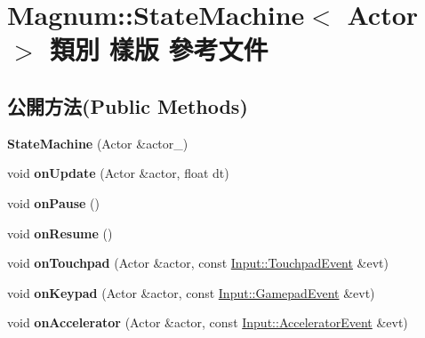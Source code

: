 \hypertarget{class_magnum_1_1_state_machine}{}\section{Magnum\+:\+:State\+Machine$<$ Actor $>$ 類別 樣版 參考文件}
\label{class_magnum_1_1_state_machine}
\subsection*{公開方法(Public Methods)}
\begin{DoxyCompactItemize}
\item 
{\bfseries State\+Machine} (Actor \&actor\+\_\+)\hypertarget{class_magnum_1_1_state_machine_a1f530100fca6bc09bf0b3fb9c5f458fb}{}\label{class_magnum_1_1_state_machine_a1f530100fca6bc09bf0b3fb9c5f458fb}

\item 
void {\bfseries on\+Update} (Actor \&actor, float dt)\hypertarget{class_magnum_1_1_state_machine_a10d52e27c6a2c0315d663aa64a4785dd}{}\label{class_magnum_1_1_state_machine_a10d52e27c6a2c0315d663aa64a4785dd}

\item 
void {\bfseries on\+Pause} ()\hypertarget{class_magnum_1_1_state_machine_a432b7584b2e4870038a9caf0bd861b7e}{}\label{class_magnum_1_1_state_machine_a432b7584b2e4870038a9caf0bd861b7e}

\item 
void {\bfseries on\+Resume} ()\hypertarget{class_magnum_1_1_state_machine_a2867b609c964769e91bde527496d7c54}{}\label{class_magnum_1_1_state_machine_a2867b609c964769e91bde527496d7c54}

\item 
void {\bfseries on\+Touchpad} (Actor \&actor, const \hyperlink{class_magnum_1_1_input_1_1_touchpad_event}{Input\+::\+Touchpad\+Event} \&evt)\hypertarget{class_magnum_1_1_state_machine_a4a45eabe0a269499fbf918055c947f9b}{}\label{class_magnum_1_1_state_machine_a4a45eabe0a269499fbf918055c947f9b}

\item 
void {\bfseries on\+Keypad} (Actor \&actor, const \hyperlink{class_magnum_1_1_input_1_1_gamepad_event}{Input\+::\+Gamepad\+Event} \&evt)\hypertarget{class_magnum_1_1_state_machine_a4acc3eb950d9aac1e98394499efadec7}{}\label{class_magnum_1_1_state_machine_a4acc3eb950d9aac1e98394499efadec7}

\item 
void {\bfseries on\+Accelerator} (Actor \&actor, const \hyperlink{class_magnum_1_1_input_1_1_accelerator_event}{Input\+::\+Accelerator\+Event} \&evt)\hypertarget{class_magnum_1_1_state_machine_a479f28ff196847ecfcec41ef266a42b8}{}\label{class_magnum_1_1_state_machine_a479f28ff196847ecfcec41ef266a42b8}


\end{DoxyCompactItemize}
